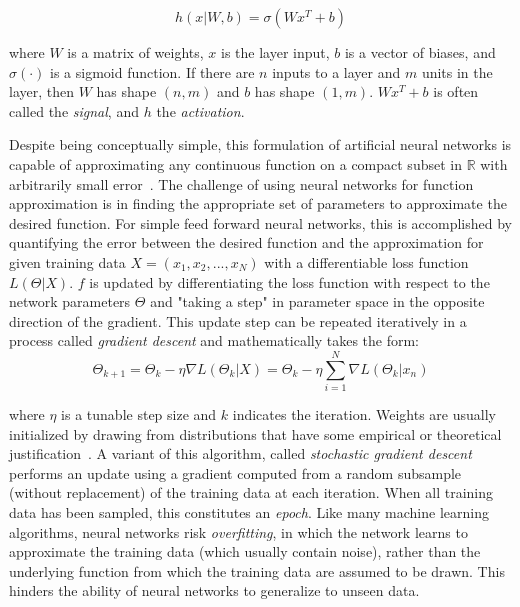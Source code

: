 \begin{equation}
h(x|W, b)=\sigma(W x^T + b)
\label{eq:denselayer}
\end{equation}

\noindent
where $W$ is a matrix of weights, $x$ is the layer input, $b$ is a vector of biases, and $\sigma(\cdot)$ is a sigmoid function.
If there are $n$ inputs to a layer and $m$ units in the layer, then $W$ has shape $(n,m)$ and $b$ has shape $(1,m)$.
$W x^T + b$ is often called the \textit{signal}, and $h$ the \textit{activation}.

Despite being conceptually simple, this formulation of artificial neural networks is capable of approximating any continuous function on a compact subset in $\mathbb{R}$ with arbitrarily small error~\cite{cybenko1989}.
The challenge of using neural networks for function approximation is in finding the appropriate set of parameters to approximate the desired function.
For simple feed forward neural networks, this is accomplished by quantifying the error between the desired function and the approximation for given training data $X=(x_1, x_2, ..., x_N)$ with a differentiable loss function $L(\Theta | X)$. 
$f$ is updated by differentiating the loss function with respect to the network parameters $\Theta$ and "taking a step" in parameter space in the opposite direction of the gradient. 
This update step can be repeated iteratively in a process called \textit{gradient descent} and mathematically takes the form:
\begin{equation}
\Theta_{k+1} = \Theta_k - \eta \nabla L(\Theta_k | X) = \Theta_k - \eta \sum_{i=1}^{N} \nabla L(\Theta_k | x_n)
\label{eq:batch_gd}
\end{equation}

\noindent
where $\eta$ is a tunable step size and $k$ indicates the iteration.
Weights are usually initialized by drawing from distributions that have some empirical or theoretical justification~\cite{glorot2010}.
A variant of this algorithm, called \textit{stochastic gradient descent} performs an update using a gradient computed from a random subsample (without replacement) of the training data at each iteration.
When all training data has been sampled, this constitutes an \textit{epoch}.
Like many machine learning algorithms, neural networks risk \textit{overfitting}, in which the network learns to approximate the training data (which usually contain noise), rather than the underlying function from which the training data are assumed to be drawn.
This hinders the ability of neural networks to generalize to unseen data.

